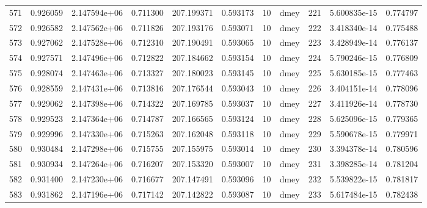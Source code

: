 \begin{tabular}{lrrrrrrlrrr}
571  &    0.926059 &        2.147594e+06 &  0.711300 &              207.199371 &    0.593173 &      10 &         dmey &    221 &   5.600835e-15 &      0.774797 \\
572  &    0.926582 &        2.147562e+06 &  0.711826 &              207.193176 &    0.593071 &      10 &         dmey &    222 &   3.418340e-14 &      0.775488 \\
573  &    0.927062 &        2.147528e+06 &  0.712310 &              207.190491 &    0.593065 &      10 &         dmey &    223 &   3.428949e-14 &      0.776137 \\
574  &    0.927571 &        2.147496e+06 &  0.712822 &              207.184662 &    0.593154 &      10 &         dmey &    224 &   5.790246e-15 &      0.776809 \\
575  &    0.928074 &        2.147463e+06 &  0.713327 &              207.180023 &    0.593145 &      10 &         dmey &    225 &   5.630185e-15 &      0.777463 \\
576  &    0.928559 &        2.147431e+06 &  0.713816 &              207.176544 &    0.593043 &      10 &         dmey &    226 &   3.404151e-14 &      0.778096 \\
577  &    0.929062 &        2.147398e+06 &  0.714322 &              207.169785 &    0.593037 &      10 &         dmey &    227 &   3.411926e-14 &      0.778730 \\
578  &    0.929523 &        2.147364e+06 &  0.714787 &              207.166565 &    0.593124 &      10 &         dmey &    228 &   5.625096e-15 &      0.779365 \\
579  &    0.929996 &        2.147330e+06 &  0.715263 &              207.162048 &    0.593118 &      10 &         dmey &    229 &   5.590678e-15 &      0.779971 \\
580  &    0.930484 &        2.147298e+06 &  0.715755 &              207.155975 &    0.593014 &      10 &         dmey &    230 &   3.394378e-14 &      0.780596 \\
581  &    0.930934 &        2.147264e+06 &  0.716207 &              207.153320 &    0.593007 &      10 &         dmey &    231 &   3.398285e-14 &      0.781204 \\
582  &    0.931400 &        2.147230e+06 &  0.716677 &              207.147491 &    0.593096 &      10 &         dmey &    232 &   5.539822e-15 &      0.781817 \\
583  &    0.931862 &        2.147196e+06 &  0.717142 &              207.142822 &    0.593087 &      10 &         dmey &    233 &   5.617484e-15 &      0.782438 \\

\end{tabular}
